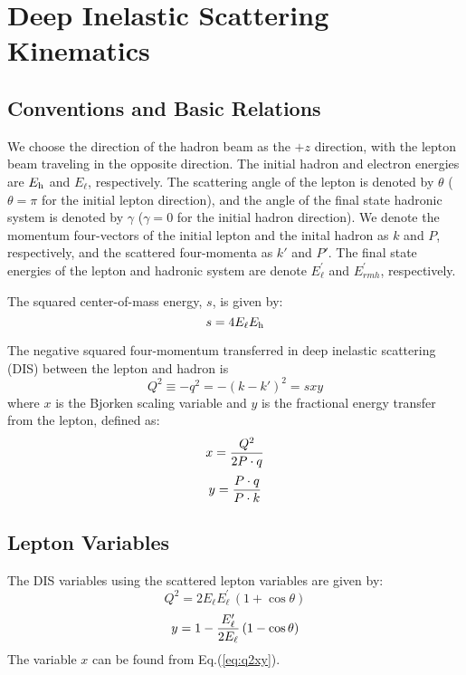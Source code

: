 \documentclass[12pt]{article}
\begin{document}
\section{Deep Inelastic Scattering Kinematics}

\subsection{Conventions and Basic Relations}

We choose the direction of the hadron beam as the $+z$ direction, with
the lepton beam traveling in the opposite direction. The initial
hadron and electron energies are $E_{\rm h}$ and $E_{\ell}$,
respectively. The scattering angle of the lepton is denoted by
$\theta$ ($\theta = \pi$ for the initial lepton direction), and the angle
of the final state hadronic system is denoted by $\gamma$ ($\gamma=0$
for the initial hadron direction).
We denote the momentum four-vectors of the initial
lepton and the  inital hadron as $k$ and $P$, respectively, and the
scattered four-momenta as $k'$ and $P'$. The final state energies of
the lepton and hadronic system are denote $E^\prime_\ell$ and
$E^\prime_{  rm h}$, respectively.


The squared center-of-mass energy, ${s}$, is given by:
%
\begin{equation}
s = 4E_{\ell}E_{\rm h}
%
\end{equation}

The negative squared four-momentum transferred in deep inelastic
scattering (DIS) between the lepton and hadron is
%
\begin{equation}
Q^2 \equiv - q^2 = -(k - k')^2  = s x y
\label{eq:q2xy}
\end{equation}
%
where $x$ is the Bjorken scaling variable and $y$ is the
fractional energy transfer from the lepton, defined as:
%
\begin{equation}
  x = {Q^2 \over 2 P\cdot q} 
\end{equation}
\begin{equation}
  y = {P\cdot q \over P\cdot k}
\end{equation}
%


\subsection{Lepton Variables}

The DIS variables using the scattered lepton variables are given by:
%
\begin{equation}
Q^2 = 2 E_\ell E^\prime_\ell\, (1+ \cos \theta)
\label{eq:Q2e}
\end{equation}
\begin{equation}
y = 1 - {E^\prime_\ell \over 2 E_\ell} \, (1-\cos\theta)
\label{eq:ye}
\end{equation}
%
The variable $x$ can be found from Eq.(\ref{eq:q2xy}).
\end{document}
